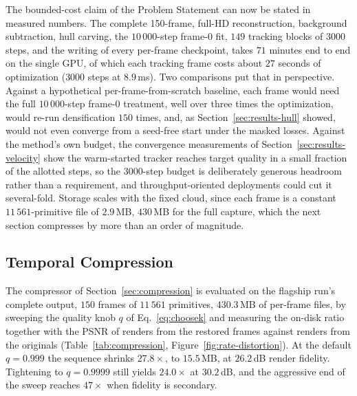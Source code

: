 The bounded-cost claim of the Problem Statement can now be stated in measured numbers.
The complete 150-frame, full-HD reconstruction, background subtraction, hull carving,
the $10\,000$-step frame-0 fit, $149$ tracking blocks of $3000$ steps, and the
writing of every per-frame checkpoint, takes $71$ minutes end to end on the single
GPU, of which each tracking frame costs about $27$ seconds of optimization ($3000$
steps at $8.9$\,ms). Two comparisons put that in perspective. Against a hypothetical
per-frame-from-scratch baseline, each frame would need the full $10\,000$-step
frame-0 treatment, well over three times the optimization, would re-run
densification $150$ times, and, as Section~\ref{sec:results-hull} showed, would not
even converge from a seed-free start under the masked losses. Against the method's
own budget, the convergence measurements of Section~\ref{sec:results-velocity} show
the warm-started tracker reaches target quality in a small fraction of the allotted
steps, so the $3000$-step budget is deliberately generous headroom rather than a
requirement, and throughput-oriented deployments could cut it several-fold. Storage
scales with the fixed cloud, since each frame is a constant $11\,561$-primitive file of
$2.9$\,MB, $430$\,MB for the full capture, which the next section compresses by more
than an order of magnitude.

\subsection{Temporal Compression}
\label{sec:results-compression}

The compressor of Section~\ref{sec:compression} is evaluated on the flagship run's
complete output, $150$ frames of $11\,561$ primitives, $430.3$\,MB of per-frame
files, by sweeping the quality knob $q$ of Eq.~\eqref{eq:choosek} and measuring the
on-disk ratio together with the PSNR of renders from the restored frames against
renders from the originals (Table~\ref{tab:compression},
Figure~\ref{fig:rate-distortion}). At the default $q = 0.999$ the sequence shrinks
$27.8\times$, to $15.5$\,MB, at $26.2$\,dB render fidelity. Tightening to
$q = 0.9999$ still yields $24.0\times$ at $30.2$\,dB, and the aggressive end of the
sweep reaches $47\times$ when fidelity is secondary.

